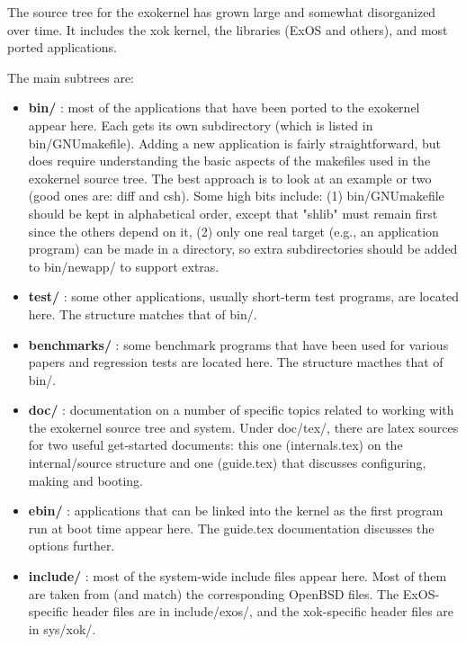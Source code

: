 The source tree for the exokernel has grown large and somewhat disorganized
over time.  It includes the xok kernel, the libraries (ExOS and others),
and most ported applications.

The main subtrees are:

\begin{itemize}

\item {\bf bin/} : most of the applications that have been ported to the
exokernel appear here.  Each gets its own subdirectory (which is listed
in bin/GNUmakefile).  Adding a new application is fairly straightforward,
but does require understanding the basic aspects of the makefiles used
in the exokernel source tree.  The best approach is to look at an example
or two (good ones are: diff and csh).  Some high bits include:
(1) bin/GNUmakefile should be kept in alphabetical order, except that
"shlib" must remain first since the others depend on it,
(2) only one real target (e.g., an application program) can be made
in a directory, so extra subdirectories should be added to bin/newapp/
to support extras.

\item {\bf test/} : some other applications, usually short-term test programs,
are located here.  The structure matches that of bin/.

\item {\bf benchmarks/} : some benchmark programs that have been used for
various papers and regression tests are located here.  The structure
macthes that of bin/.

\item {\bf doc/} : documentation on a number of specific topics related to
working with the exokernel source tree and system.  Under doc/tex/, there
are latex sources for two useful get-started documents: this one
(internals.tex) on the internal/source structure and one (guide.tex)
that discusses configuring, making and booting.

\item {\bf ebin/} : applications that can be linked into the kernel as
the first program run at boot time appear here.  The guide.tex
documentation discusses the options further.

\item {\bf include/} : most of the system-wide include files appear here.
Most of them are taken from (and match) the corresponding OpenBSD files.
The ExOS-specific header files are in include/exos/, and the xok-specific
header files are in sys/xok/.


\end{itemize}

